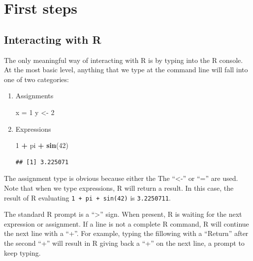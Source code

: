 \documentclass[]{article}
\newenvironment{Shaded}{\begin{snugshade}}{\end{snugshade}}
\newcommand{\KeywordTok}[1]{\textcolor[rgb]{0.13,0.29,0.53}{\textbf{#1}}}
\newcommand{\DecValTok}[1]{\textcolor[rgb]{0.00,0.00,0.81}{#1}}
\newcommand{\StringTok}[1]{\textcolor[rgb]{0.31,0.60,0.02}{#1}}
\newcommand{\OperatorTok}[1]{\textcolor[rgb]{0.81,0.36,0.00}{\textbf{#1}}}
\newcommand{\NormalTok}[1]{#1}
\theoremstyle{definition}
\theoremstyle{definition}
\theoremstyle{remark}
\begin{document}
\section{First steps}\label{first-steps}

\subsection{Interacting with R}\label{interacting-with-r}

The only meaningful way of interacting with R is by typing into the R
console. At the most basic level, anything that we type at the command
line will fall into one of two categories:

\begin{enumerate}
\def\labelenumi{\arabic{enumi}.}
\item
  Assignments

\begin{Shaded}
\begin{Highlighting}[]
\NormalTok{x =}\StringTok{ }\DecValTok{1}
\NormalTok{y <-}\StringTok{ }\DecValTok{2}
\end{Highlighting}
\end{Shaded}
\item
  Expressions

\begin{Shaded}
\begin{Highlighting}[]
\DecValTok{1} \OperatorTok{+}\StringTok{ }\NormalTok{pi }\OperatorTok{+}\StringTok{ }\KeywordTok{sin}\NormalTok{(}\DecValTok{42}\NormalTok{)}
\end{Highlighting}
\end{Shaded}

\begin{verbatim}
## [1] 3.225071
\end{verbatim}
\end{enumerate}

The assignment type is obvious because either the The ``\textless{}-''
or ``='' are used. Note that when we type expressions, R will return a
result. In this case, the result of R evaluating
\texttt{1\ +\ pi\ +\ sin(42)} is \texttt{3.2250711}.

The standard R prompt is a ``\textgreater{}'' sign. When present, R is
waiting for the next expression or assignment. If a line is not a
complete R command, R will continue the next line with a ``+''. For
example, typing the fillowing with a ``Return'' after the second ``+''
will result in R giving back a ``+'' on the next line, a prompt to keep
typing.
\end{document}
